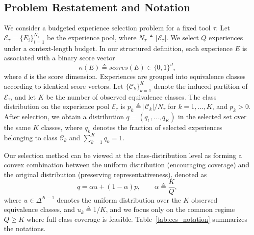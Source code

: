 \documentclass[11pt]{article}
\begin{document}
\subsection{Problem Restatement and Notation}
We consider a budgeted experience selection problem for a fixed tool $\tau$.
Let $\mathcal{E}_\tau=\{E_i\}_{i=1}^{N_\tau}$ be the experience pool, where
$N_\tau \triangleq |\mathcal{E}_\tau|$.
We select $Q$ experiences under a context-length budget. 
In our structured definition, each experience $E$ is associated with a binary score vector
\begin{equation}
\kappa(E)\triangleq scores(E)\in\{0,1\}^d,
\end{equation}
where $d$ is the score dimension.
Experiences are grouped into equivalence classes according to identical score vectors.
Let $\{\mathcal{C}_k\}_{k=1}^{K}$ denote the induced partition of $\mathcal{E}_\tau$, and let $K$ be the number of
observed equivalence classes.
The class distribution on the experience pool $\mathcal{E}_\tau$ is $p_k \triangleq {|\mathcal{C}_k|}/{N_\tau}$ for $k=1,\dots,K$, and $p_k>0$.  
After selection, we obtain a distribution $q=(q_1,\dots,q_K)$ in the selected set over the same $K$ classes,
where $q_k$ denotes the fraction of selected experiences belonging to class $\mathcal{C}_k$ and
$\sum_{k=1}^K q_k = 1$.

Our selection method can be viewed at the class-distribution level as forming a convex combination between
the uniform distribution (encouraging coverage) and the original distribution (preserving representativeness), denoted as
\begin{equation}
\label{eq:q_ours_mix}
q = \alpha u + (1-\alpha)p,
\qquad \alpha \triangleq \frac{K}{Q},
\end{equation}
where $u\in\Delta^{K-1}$ denotes the uniform distribution over the $K$ observed equivalence classes, and
$u_k \triangleq 1/K$, and we focus only on the common regime $Q\ge K$ where full class coverage is feasible. Table~\ref{tab:ecs_notation} summarizes the notations.
\end{document}
